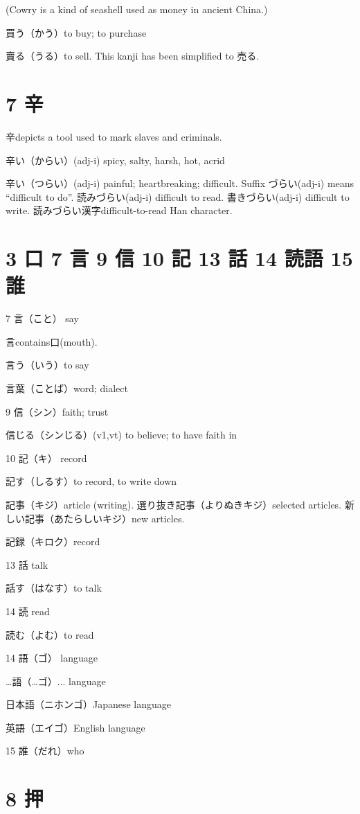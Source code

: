 (Cowry is a kind of seashell used as money in ancient China.)

買う（かう）to buy; to purchase

賣る（うる）to sell.
This kanji has been simplified to 売る.

\section{7 辛}

辛depicts a tool used to mark slaves and criminals.

辛い（からい）(adj-i) spicy, salty, harsh, hot, acrid

辛い（つらい）(adj-i) painful; heartbreaking; difficult.
Suffix づらい(adj-i) means ``difficult to do''.
読みづらい(adj-i) difficult to read.
書きづらい(adj-i) difficult to write.
読みづらい漢字difficult-to-read Han character.

\section{3 口 7 言 9 信 10 記 13 話 14 読語 15 誰}

7 言（こと） say

言contains口(mouth).

言う（いう）to say

言葉（ことば）word; dialect

9 信（シン）faith; trust

信じる（シンじる）(v1,vt) to believe; to have faith in

10 記（キ） record

記す（しるす）to record, to write down

記事（キジ）article (writing).
選り抜き記事（よりぬきキジ）selected articles.
新しい記事（あたらしいキジ）new articles.

記録（キロク）record

13 話 talk

話す（はなす）to talk

14 読 read

読む（よむ）to read

14 語（ゴ） language

…語（…ゴ）... language

日本語（ニホンゴ）Japanese language

英語（エイゴ）English language

15 誰（だれ）who

\section{8 押}

